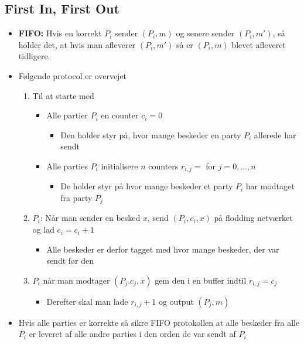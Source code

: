 \documentclass[a4, english]{article}
\begin{document}
\subsection{First In, First Out}
\begin{itemize}
	\item \textbf{FIFO:} Hvis en korrekt $P_i$ sender $(P_i,m)$ og senere sender $(P_i,m')$, så holder det, at hvis man afleverer $(P_i,m')$ så er $(P_i, m)$ blevet afleveret tidligere. 
  \item Følgende protocol er overvejet 
  \begin{enumerate}
    \item Til at starte med
    \begin{itemize}
      \item Alle partier $P_i$ en counter $c_i=0$ 
      \begin{itemize}
        \item Den holder styr på, hvor mange beskeder en party $P_i$ allerede har sendt 
      \end{itemize}
      \item Alle parties $P_i$ initialisere $n$ counters $r_{i,j} =$ for $j=0,\dots,n$
      \begin{itemize}
      	\item De holder styr på hvor mange beskeder et party $P_i$ har modtaget fra party $P_j$ 
      \end{itemize}
    \end{itemize}
    \item $P_i$: Når man sender en besked $x$, send $(P_i, c_i,x)$ på flodding netværket og lad $c_i = c_i+ 1$
    \begin{itemize}
    	\item Alle beskeder er derfor tagget med hvor mange beskeder, der var sendt før den
    \end{itemize}
    \item $P_i$ når man modtager $(P_j. c_j,x)$ gem den i en buffer indtil $r_{i,j} = c_j$ 
    \begin{itemize}
    	\item Derefter skal man lade $r_{i,j} + 1$ og output $(P_j,m)$ 
    \end{itemize}
  \end{enumerate}
  \item Hvis alle parties er korrekte så sikre FIFO protokollen at alle beskeder fra alle $P_i$ er leveret af alle andre parties i den orden de var sendt af $P_i$ 
\end{itemize}
\end{document}
